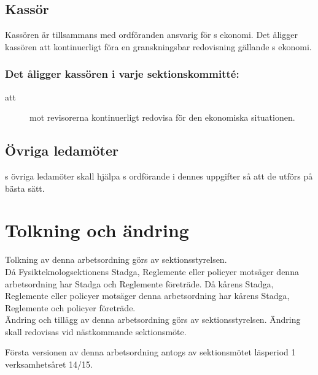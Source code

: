 \subsection{Kassör}
Kassören är tillsammans med ordföranden ansvarig för \forening s ekonomi. Det åligger kassören att kontinuerligt föra en granskningsbar redovisning gällande \forening s ekonomi.\\

\subsubsection{Det åligger kassören i varje sektionskommitté:}
\begin{description}
\item[att] mot revisorerna kontinuerligt redovisa för den ekonomiska situationen.

\end{description}


\subsection{Övriga ledamöter}
\forening s övriga ledamöter skall hjälpa \forening s ordförande i dennes uppgifter så att de utförs på bästa sätt.

\section{Tolkning och ändring}
Tolkning av denna arbetsordning görs av sektionsstyrelsen.\\ Då Fysikteknologsektionens Stadga, Reglemente eller policyer motsäger denna arbetsordning har Stadga och Reglemente företräde. Då kårens Stadga, Reglemente eller policyer motsäger denna arbetsordning har kårens Stadga, Reglemente och policyer företräde.\\
Ändring och tillägg av denna arbetsordning görs av sektionsstyrelsen. Ändring skall redovisas vid nästkommande sektionsmöte. 

Första versionen av denna arbetsordning antogs av sektionsmötet läsperiod 1 verksamhetsåret 14/15.

\newpage
